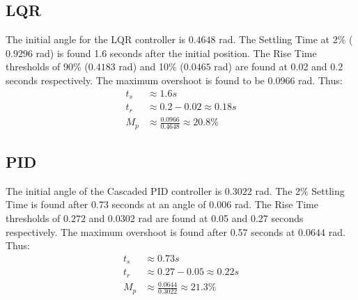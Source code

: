 \subsection{LQR}
The initial angle for the LQR controller is $0.4648$ rad. The Settling Time at 2\% ($0.9296$ rad) is found 1.6 seconds after the initial position. The Rise Time thresholds of 90\% ($0.4183$ rad) and 10\% ($0.0465$ rad) are found at 0.02 and 0.2 seconds respectively. The maximum overshoot is found to be $0.0966$ rad. Thus:
\begin{align}
	t_s &\approx 1.6 s \\
	t_r &\approx 0.2 - 0.02 \approx 0.18 s \\
	M_p &\approx \frac{0.0966}{0.4648} \approx 20.8\%
\end{align}

\subsection{PID}
The initial angle of the Cascaded PID controller is $0.3022$ rad. The 2\% Settling Time is found after 0.73 seconds at an angle of $0.006$ rad. The Rise Time thresholds of $0.272$ and $0.0302$ rad are found at 0.05 and 0.27 seconds respectively. The maximum overshoot is found after 0.57 seconds at $0.0644$ rad. Thus:
\begin{align}
	t_s &\approx 0.73s \\
	t_r &\approx 0.27 - 0.05 \approx 0.22s \\
	M_p &\approx \frac{0.0644}{0.3022} \approx 21.3\%
\end{align}
